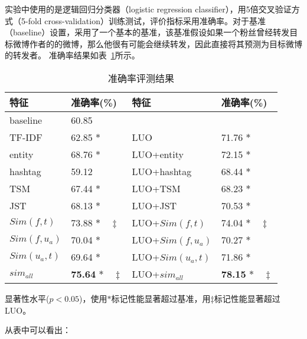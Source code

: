 实验中使用的是逻辑回归分类器（logistic regression classifier），用5倍交叉验证方式（5-fold cross-validation）训练测试，评价指标采用准确率。对于基准（baseline）设置，采用了一个基本的基准，该基准假设如果一个粉丝曾经转发目标微博作者的的微博，那么他很有可能会继续转发，因此直接将其预测为目标微博的转发者。
准确率结果如表~\ref{tab6-6}所示。

\begin{table}[htb]
\centering
\caption{准确率评测结果}
\label{tab6-6}
\begin{threeparttable}
\begin{tabular}{|l|l|l|l|}
\hline
特征 &准确率(\%) & 特征 &准确率(\%)\\
\hline
baseline & 60.85 & & \\
\hline
TF-IDF & 62.85   $\ast$ & LUO & 71.76 $ \ast  $\\
entity & 68.76  $\ast$ & LUO+entity & 72.15 $\ast$\\
hashtag & 59.12  & LUO+hashtag & 68.44 $\ast$\\
\hline
TSM & 67.44 $\ast$ & LUO+TSM & 68.23 $\ast$\\
JST & 68.13 $\ast$ & LUO+JST & 70.53 $\ast$\\
\hline
$ Sim(f,t) $ & 73.88   $\ast  \quad \ddagger $ &LUO+$ Sim(f,t)$ & 74.04  $ \ast \quad \ddagger $\\
$ Sim(f,u_a)  $ & 70.04   $\ast  $ & LUO+$ Sim(f,u_a)$ & 70.27  $ \ast $\\
$ Sim(u_a,t)  $ & 69.64   $\ast  $ & LUO+$ Sim(u_a,t)$ & 71.86  $ \ast $\\
$ sim_{all}  $ & \textbf{75.64}   $\ast \quad \ddagger $ & LUO+$ sim_{all}  $ & \textbf{78.15}  $ \ast \quad \ddagger $\\
\hline
\end{tabular}
\begin{tablenotes}
  \footnotesize
\item 显著性水平($p < 0.05$)，使用$ \ast $标记性能显著超过基准，用$ \ddagger $标记性能显著超过LUO。
\end{tablenotes}
\end{threeparttable}
\end{table}
从表中可以看出：
